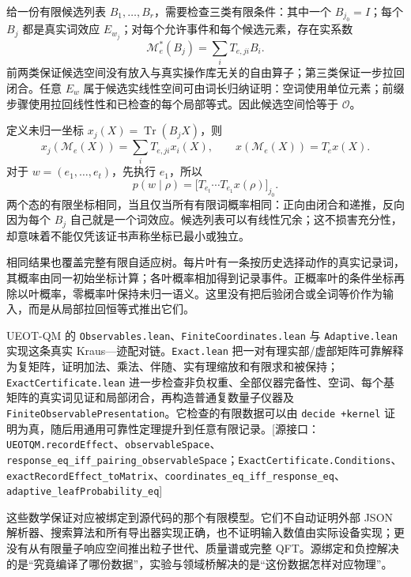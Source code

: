 \documentclass[
  11pt,
  oneside]{book}
\begin{document}
给一份有限候选列表 \(B_1,\ldots,B_r\)，需要检查三类有限条件：其中一个
\(B_{j_0}=I\)；每个 \(B_j\) 都是真实词效应
\(E_{w_j}\)；对每个允许事件和每个候选元素，存在实系数 \[
\mathcal M_e^*(B_j)=\sum_iT_{e,ji}B_i.
\]
前两类保证候选空间没有放入与真实操作库无关的自由算子；第三类保证一步拉回闭合。任意
\(E_w\)
属于候选实线性空间可由词长归纳证明：空词使用单位元素；前缀步骤使用拉回线性性和已检查的每个局部等式。因此候选空间恰等于
\(\mathcal O\)。

定义未归一坐标 \(x_j(X)=\operatorname{Tr}(B_jX)\)，则 \[
x_j(\mathcal M_e(X))=\sum_iT_{e,ji}x_i(X),\qquad
x(\mathcal M_e(X))=T_ex(X).
\] 对于 \(w=(e_1,\ldots,e_t)\)，先执行 \(e_1\)，所以 \[
p(w\mid\rho)=\bigl[T_{e_t}\cdots T_{e_1}x(\rho)\bigr]_{j_0}.
\]
两个态的有限坐标相同，当且仅当所有有限词概率相同：正向由闭合和递推，反向因为每个
\(B_j\)
自己就是一个词效应。候选列表可以有线性冗余；这不损害充分性，却意味着不能仅凭该证书声称坐标已最小或独立。

相同结果也覆盖完整有限自适应树。每片叶有一条按历史选择动作的真实记录词，其概率由同一初始坐标计算；各叶概率相加得到记录事件。正概率叶的条件坐标再除以叶概率，零概率叶保持未归一语义。这里没有把后验闭合或全词等价作为输入，而是从局部拉回恒等式推出它们。

UEOT-QM 的 \texttt{Observables.\allowbreak lean}、\allowbreak \texttt{Finite\allowbreak Coordinates.\allowbreak lean} 与
\texttt{Adaptive.\allowbreak lean} 实现这条真实
Kraus---迹配对链。\texttt{Exact.\allowbreak lean}
把一对有理实部/虚部矩阵可靠解释为复矩阵，证明加法、乘法、伴随、实有理缩放和有限求和被保持；\texttt{Exact\allowbreak Certificate.\allowbreak lean}
进一步检查非负权重、全部仪器完备性、空词、每个基矩阵的真实词见证和局部闭合，再构造普通复数量子仪器及
\texttt{Finite\allowbreak Observable\allowbreak Presentation}。它检查的有限数据可以由
\texttt{decide\ +kernel}
证明为真，随后用通用可靠性定理提升到任意有限记录。{[}源接口：\texttt{UEOTQM.\allowbreak record\allowbreak Effect}、\allowbreak \texttt{observable\allowbreak Space}、\allowbreak \texttt{response\_\allowbreak eq\_\allowbreak iff\_\allowbreak pairing\_\allowbreak observable\allowbreak Space}；\texttt{Exact\allowbreak Certificate.\allowbreak Conditions}、\allowbreak \texttt{exact\allowbreak Record\allowbreak Effect\_\allowbreak to\allowbreak Matrix}、\allowbreak \texttt{coordinates\_\allowbreak eq\_\allowbreak iff\_\allowbreak response\_\allowbreak eq}、\allowbreak \texttt{adaptive\_\allowbreak leaf\allowbreak Probability\_\allowbreak eq}{]}

这些数学保证对应被绑定到源代码的那个有限模型。它们不自动证明外部 JSON
解析器、搜索算法和所有导出器实现正确，也不证明输入数值由实际设备实现；更没有从有限量子响应空间推出粒子世代、质量谱或完整
QFT。源绑定和负控解决的是``究竟编译了哪份数据''，实验与领域桥解决的是``这份数据怎样对应物理''。
\end{document}
